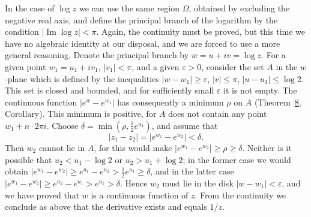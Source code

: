 In the case of $\log z$ we can use the same region $\Omega$, obtained by excluding the negative real axis, and define the principal branch of the logarithm by the condition $|\operatorname{Im} \log z| < \pi$. Again, the continuity must be proved, but this time we have no algebraic identity at our disposal, and we are forced to use a more general reasoning. Denote the principal branch by $w = u + iv = \log z$. For a given point $w_1 = u_1 + iv_1$, $|v_1| < \pi$, and a given $\varepsilon > 0$, consider the set $A$ in the $w$-plane which is defined by the inequalities $|w - w_1| \geq \varepsilon$, $|v| \leq \pi$, $|u - u_1| \leq \log 2$. This set is closed and bounded, and for sufficiently small $\varepsilon$ it is not empty. The continuous function $|e^w - e^{w_1}|$ has consequently a minimum $\rho$ on $A$ (Theorem~\hyperref[thm:3.8]{8}, Corollary). This minimum is positive, for $A$ does not contain any point $w_1 + n \cdot 2\pi i$. Choose $\delta = \min (\rho, \frac{1}{2} e^{u_1})$, and assume that
\begin{equation*}
\left| z _ {1} - z _ {2} \right| = \left| e ^ {w _ {1}} - e ^ {w _ {2}} \right| <   \delta .
\end{equation*}
Then $w_{2}$ cannot lie in $A$, for this would make $|e^{w_1} - e^{w_2}| \geq \rho \geq \delta$. Neither is it possible that $u_{2} < u_{1} - \log 2$ or $u_{2} > u_{1} + \log 2$; in the former case we would obtain $|e^{w_1} - e^{w_2}| \geq e^{u_1} - e^{u_2} > \frac{1}{2} e^{u_1} \geq \delta$, and in the latter case $|e^{w_1} - e^{w_2}| \geq e^{u_2} - e^{u_1} > e^{u_1} > \delta$. Hence $w_{2}$ must lie in the disk $|w - w_1| < \varepsilon$, and we have proved that $w$ is a continuous function of $z$. From the continuity we conclude as above that the derivative exists and equals $1/z$.

